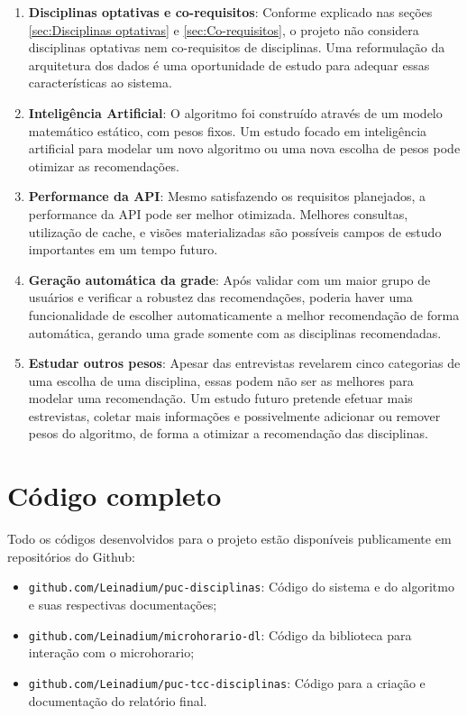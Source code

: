 \begin{enumerate}
    \item \textbf{Disciplinas optativas e co-requisitos}: Conforme explicado nas seções \ref{sec:Disciplinas optativas} e \ref{sec:Co-requisitos}, o projeto não considera disciplinas optativas nem co-requisitos de disciplinas. Uma reformulação da arquitetura dos dados é uma oportunidade de estudo para adequar essas características ao sistema.

    \item \textbf{Inteligência Artificial}: O algoritmo foi construído através de um modelo matemático estático, com pesos fixos. Um estudo focado em inteligência artificial para modelar um novo algoritmo ou uma nova escolha de pesos pode otimizar as recomendações.
    
    \item \textbf{Performance da API}: Mesmo satisfazendo os requisitos planejados, a performance da API pode ser melhor otimizada. Melhores consultas, utilização de cache, e visões materializadas são possíveis campos de estudo importantes em um tempo futuro.
    
    \item \textbf{Geração automática da grade}: Após validar com um maior grupo de usuários e verificar a robustez das recomendações, poderia haver uma funcionalidade de escolher automaticamente a melhor recomendação de forma automática, gerando uma grade somente com as disciplinas recomendadas.
    
    \item \textbf{Estudar outros pesos}: Apesar das entrevistas revelarem cinco categorias de uma escolha de uma disciplina, essas podem não ser as melhores para modelar uma recomendação. Um estudo futuro pretende efetuar mais estrevistas, coletar mais informações e possivelmente adicionar ou remover pesos do algoritmo, de forma a otimizar a recomendação das disciplinas.
\end{enumerate}

\section{Código completo}


Todo os códigos desenvolvidos para o projeto estão disponíveis publicamente em repositórios do Github:

\begin{itemize}
    \item \verb|github.com/Leinadium/puc-disciplinas|: Código do sistema e do algoritmo e suas respectivas documentações;
    \item \verb|github.com/Leinadium/microhorario-dl|: Código da biblioteca para interação com o microhorario;
    \item \verb|github.com/Leinadium/puc-tcc-disciplinas|: Código para a criação e documentação do relatório final.
\end{itemize}
